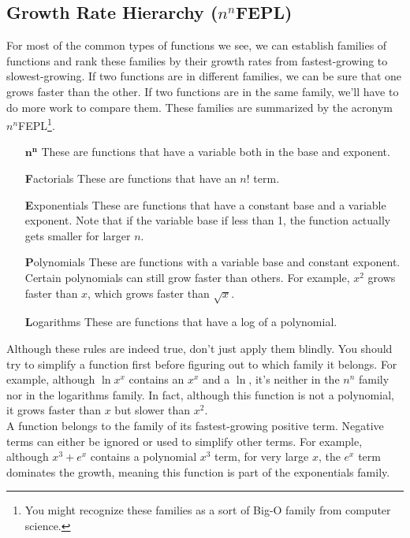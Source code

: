 \subsection{Growth Rate Hierarchy ($n^n$FEPL)}
For most of the common types of functions we see, we can establish families of functions and rank these families by their growth rates from fastest-growing to slowest-growing.
If two functions are in different families, we can be sure that one grows faster than the other.
If two functions are in the same family, we'll have to do more work to compare them.
These families are summarized by the acronym $n^n$FEPL\footnote{You might recognize these families as a sort of Big-O family from computer science.}.
\begin{itemize}[align=left, leftmargin=0.66in]
	\item[$\textbf{n}^\textbf{n}$] These are functions that have a variable both in the base and exponent.
	\item[\textbf{F}actorials] These are functions that have an $n!$ term.
	\item[\textbf{E}xponentials] These are functions that have a constant base and a variable exponent.
		Note that if the variable base if less than 1, the function actually gets smaller for larger $n$.
	\item[\textbf{P}olynomials] These are functions with a variable base and constant exponent.
		Certain polynomials can still grow faster than others.
		For example, $x^2$ grows faster than $x$, which grows faster than $\sqrt{x}$.
	\item[\textbf{L}ogarithms] These are functions that have a log of a polynomial.
\end{itemize}

Although these rules are indeed true, don't just apply them blindly.
You should try to simplify a function first before figuring out to which family it belongs.
For example, although $\ln{x^x}$ contains an $x^x$ and a $\ln$, it's neither in the $n^n$ family nor in the logarithms family.
In fact, although this function is not a polynomial, it grows faster than $x$ but slower than $x^2$. \\


A function belongs to the family of its fastest-growing positive term.
Negative terms can either be ignored or used to simplify other terms.
For example, although $x^3 + e^x$ contains a polynomial $x^3$ term, for very large $x$, the $e^x$ term dominates the growth, meaning this function is part of the exponentials family.